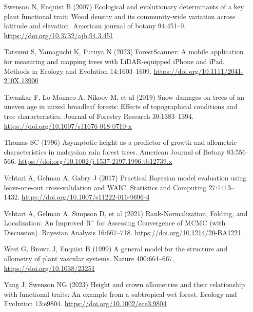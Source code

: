 \documentclass[
  12pt,
  letterpaper,
  DIV=11,
  numbers=noendperiod]{scrartcl}
\newlength{\cslhangindent}
\newlength{\cslentryspacingunit} %
\newenvironment{CSLReferences}[2] %
 {%
  \setlength{\parindent}{0pt}
  \ifodd #1
  \let\oldpar\par
  \def\par{\hangindent=\cslhangindent\oldpar}
  \fi
  \setlength{\parskip}{#2\cslentryspacingunit}
 }%
 {}
\begin{document}
\begin{CSLReferences}{1}{0}
\leavevmode{}%
Swenson N, Enquist B (2007) Ecological and evolutionary determinants of
a key plant functional trait: {Wood} density and its community-wide
variation across latitude and elevation. American journal of botany
94:451--9. \url{https://doi.org/10.3732/ajb.94.3.451}

\leavevmode{}%
Tatsumi S, Yamaguchi K, Furuya N (2023) {ForestScanner}: {A} mobile
application for measuring and mapping trees with {LiDAR}-equipped
{iPhone} and {iPad}. Methods in Ecology and Evolution 14:1603--1609.
\url{https://doi.org/10.1111/2041-210X.13900}

\leavevmode{}%
Tavankar F, Lo Monaco A, Nikooy M, et al (2019) Snow damages on trees of
an uneven age in mixed broadleaf forests: Effects of topographical
conditions and tree characteristics. Journal of Forestry Research
30:1383--1394. \url{https://doi.org/10.1007/s11676-018-0710-x}

\leavevmode{}%
Thomas SC (1996) Asymptotic height as a predictor of growth and
allometric characteristics in malaysian rain forest trees. American
Journal of Botany 83:556--566.
\url{https://doi.org/10.1002/j.1537-2197.1996.tb12739.x}

\leavevmode{}%
Vehtari A, Gelman A, Gabry J (2017) Practical {Bayesian} model
evaluation using leave-one-out cross-validation and {WAIC}. Statistics
and Computing 27:1413--1432.
\url{https://doi.org/10.1007/s11222-016-9696-4}

\leavevmode{}%
Vehtari A, Gelman A, Simpson D, et al (2021) Rank-{Normalization},
{Folding}, and {Localization}: {An} {Improved} {Rˆ} for {Assessing}
{Convergence} of {MCMC} (with {Discussion}). Bayesian Analysis
16:667--718. \url{https://doi.org/10.1214/20-BA1221}

\leavevmode{}%
West G, Brown J, Enquist B (1999) A general model for the structure and
allometry of plant vascular systems. Nature 400:664--667.
\url{https://doi.org/10.1038/23251}

\leavevmode{}%
Yang J, Swenson NG (2023) Height and crown allometries and their
relationship with functional traits: {An} example from a subtropical wet
forest. Ecology and Evolution 13:e9804.
\url{https://doi.org/10.1002/ece3.9804}

\end{CSLReferences}
\end{document}
